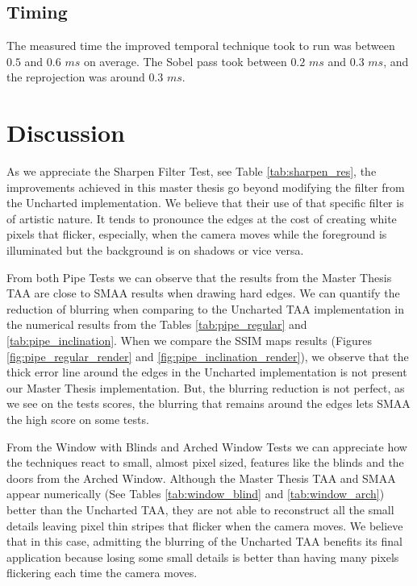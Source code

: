 \documentclass{cslthse-msc}
\begin{document}
\subsection{Timing} \label{result_timing}
The measured time the improved temporal technique took to run was between $0.5$ and $0.6$ $ms$ on average. The Sobel pass took between $0.2$ $ms$ and $0.3$ $ms$, and the reprojection was around $0.3$ $ms$.

\section{Discussion}
As we appreciate the Sharpen Filter Test, see Table \ref{tab:sharpen_res}, the improvements achieved in this master thesis go beyond modifying the filter from the Uncharted implementation. We believe that their use of that specific filter is of artistic nature. It tends to pronounce the edges at the cost of creating white pixels that flicker, especially, when the camera moves while the foreground is illuminated but the background is on shadows or vice versa. 

From both Pipe Tests we can observe that the results from the Master Thesis TAA are close to SMAA results when drawing hard edges. We can quantify the reduction of blurring when comparing to the Uncharted TAA implementation in the numerical results from the Tables \ref{tab:pipe_regular} and \ref{tab:pipe_inclination}. When we compare the SSIM maps results (Figures \ref{fig:pipe_regular_render} and \ref{fig:pipe_inclination_render}), we observe that the thick error line around the edges in the Uncharted implementation is not present our Master Thesis implementation. But, the blurring reduction is not perfect, as we see on the tests scores, the blurring that remains around the edges lets SMAA the high score on some tests.

From the Window with Blinds and Arched Window Tests we can appreciate how the techniques react to small, almost pixel sized, features like the blinds and the doors from the Arched Window. Although the Master Thesis TAA and SMAA appear numerically (See Tables \ref{tab:window_blind} and \ref{tab:window_arch}) better than the Uncharted TAA, they are not able to reconstruct all the small details leaving pixel thin stripes that flicker when the camera moves. We believe that in this case, admitting the blurring of the Uncharted TAA benefits its final application because losing some small details is better than having many pixels flickering each time the camera moves.
\end{document}

